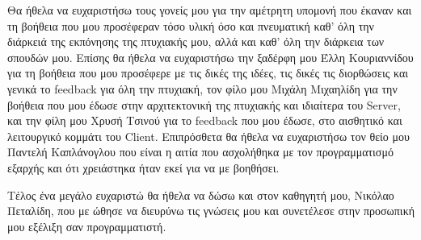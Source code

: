 \begin{Acknowledgement}
 Θα ήθελα να ευχαριστήσω τους γονείς μου για την αμέτρητη υπομονή που έκαναν και τη βοήθεια που μου προσέφεραν τόσο υλική όσο και πνευματική καθ' όλη την διάρκειά της εκπόνησης της πτυχιακής μου, αλλά και καθ' όλη την διάρκεια των σπουδών μου. Επίσης θα ήθελα να ευχαριστήσω την ξαδέρφη μου Έλλη Κουριαννίδου για τη βοήθεια που μου προσέφερε με τις δικές της ιδέες, τις δικές τις διορθώσεις και γενικά το feedback για όλη την πτυχιακή, τον φίλο μου Μιχάλη Μιχαηλίδη για την βοήθεια που μου έδωσε στην αρχιτεκτονική της πτυχιακής και ιδιαίτερα του Server, και την φίλη μου Χρυσή Τσινού για το feedback που μου έδωσε, στο αισθητικό και λειτουργικό κομμάτι του Client. Επιπρόσθετα θα ήθελα να ευχαριστήσω τον θείο μου Παντελή Καπλάνογλου που είναι η αιτία που ασχολήθηκα με τον προγραμματισμό εξαρχής και ότι χρειάστηκα ήταν εκεί για να με βοηθήσει. 
 
 Τέλος ένα μεγάλο ευχαριστώ θα ήθελα να δώσω και στον καθηγητή μου, Νικόλαο Πεταλίδη, που με ώθησε να διευρύνω τις γνώσεις μου και συνετέλεσε στην προσωπική μου εξέλιξη σαν προγραμματιστή.
\end{Acknowledgement}